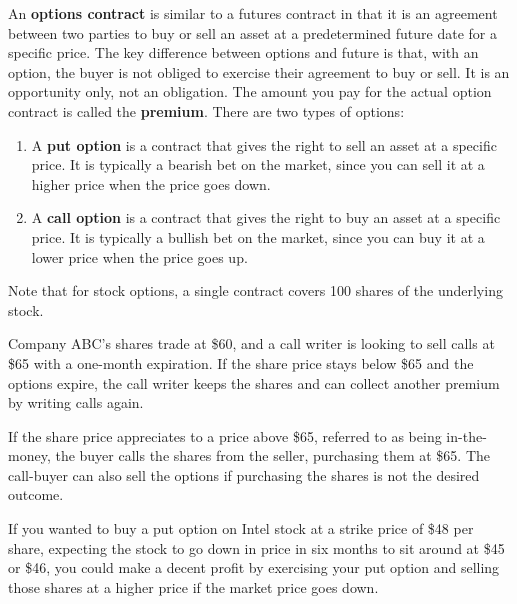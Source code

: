 \documentclass{article}
\begin{document}
      \begin{definition}
        An \textbf{options contract} is similar to a futures contract in that it is an agreement between two parties to buy or sell an asset at a predetermined future date for a specific price. The key difference between options and future is that, with an option, the buyer is not obliged to exercise their agreement to buy or sell. It is an opportunity only, not an obligation. The amount you pay for the actual option contract is called the \textbf{premium}. There are two types of options: 
        \begin{enumerate}
            \item A \textbf{put option} is a contract that gives the right to sell an asset at a specific price. It is typically a bearish bet on the market, since you can sell it at a higher price when the price goes down. 
            \item A \textbf{call option} is a contract that gives the right to buy an asset at a specific price. It is typically a bullish bet on the market, since you can buy it at a lower price when the price goes up. 
        \end{enumerate}
        Note that for stock options, a single contract covers 100 shares of the underlying stock. 
      \end{definition}

      \begin{example}
        Company ABC's shares trade at \$60, and a call writer is looking to sell calls at \$65 with a one-month expiration. If the share price stays below \$65 and the options expire, the call writer keeps the shares and can collect another premium by writing calls again. 

        If the share price appreciates to a price above \$65, referred to as being in-the-money, the buyer calls the shares from the seller, purchasing them at \$65. The call-buyer can also sell the options if purchasing the shares is not the desired outcome.
      \end{example}

      \begin{example}
        If you wanted to buy a put option on Intel stock at a strike price of \$48 per share, expecting the stock to go down in price in six months to sit around at \$45 or \$46, you could make a decent profit by exercising your put option and selling those shares at a higher price if the market price goes down. 
      \end{example}
\end{document}
